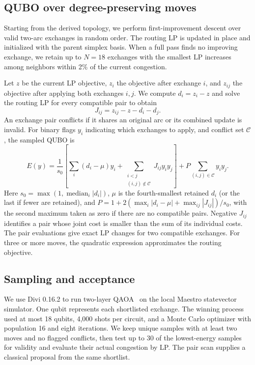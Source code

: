 \documentclass[a4paper]{article}
\begin{document}
\subsection{QUBO over degree-preserving moves}

Starting from the derived topology, we perform first-improvement descent over valid two-arc exchanges in
random order. The routing LP is updated in place and initialized with the parent simplex basis.
When a full pass finds no improving exchange, we retain up to \(N=18\) exchanges with the smallest LP increases
among neighbors within 2\% of the current congestion.

Let \(z\) be the current LP objective, \(z_i\) the objective after exchange \(i\), and \(z_{ij}\) the objective after
applying both exchanges \(i,j\). We compute \(d_i=z_i-z\) and solve the routing LP for every compatible pair to obtain
\[
J_{ij}=z_{ij}-z-d_i-d_j .
\]
An exchange pair conflicts if it shares an original arc or its combined update is invalid. For binary flags
\(y_i\) indicating which exchanges to apply, and conflict set \(\mathcal C\), the sampled QUBO is
\begin{equation}
\label{eq:compound}
E(y)=\frac{1}{s_0}\left[\sum_i(d_i-\mu)y_i
       +\sum_{\substack{i<j\\(i,j)\notin\mathcal C}}J_{ij}y_iy_j\right]
      +P\sum_{(i,j)\in\mathcal C}y_iy_j .
\end{equation}
Here \(s_0=\max(1,\operatorname{median}_i|d_i|)\), \(\mu\) is the fourth-smallest retained \(d_i\)
(or the last if fewer are retained), and \(P=1+2(\max_i|d_i-\mu|+\max_{ij}|J_{ij}|)/s_0\),
with the second maximum taken as zero if there are no compatible pairs.
Negative \(J_{ij}\) identifies a pair whose joint cost is smaller than the sum of its individual costs.
The pair evaluations give exact LP changes for two compatible exchanges. For three or more moves,
the quadratic expression approximates the routing objective.

\subsection{Sampling and acceptance}

We use Divi 0.16.2 to run two-layer QAOA~\cite{farhi2014} on the local Maestro statevector simulator.
One qubit represents each shortlisted exchange. The winning process used at most 18 qubits,
4,000 shots per circuit, and a Monte Carlo optimizer with population 16 and eight iterations.
We keep unique samples with at least two moves and no flagged conflicts, then test up to 30 of the lowest-energy
samples for validity and evaluate their actual congestion by LP. The pair scan supplies a classical proposal from the same shortlist.
\end{document}
